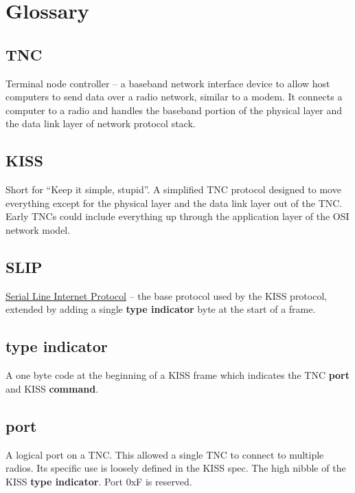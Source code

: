 \documentclass[a4paper,11pt]{book}
\begin{document}
\section{Glossary}

\subsection{TNC}

Terminal node controller -- a baseband network interface device to allow host computers to send data over a radio network, similar to a modem. It connects a computer to a radio and handles the baseband portion of the physical layer and the data link layer of network protocol stack.

\subsection{KISS}

Short for ``Keep it simple, stupid''. A simplified TNC protocol designed to move everything except for the physical layer and the data link layer out of the TNC. Early TNCs could include everything up through the application layer of the OSI network model.

\subsection{SLIP}

\href{https://en.wikipedia.org/wiki/Serial_Line_Internet_Protocol}{Serial Line Internet Protocol} -- the base protocol used by the KISS protocol, extended by adding a single \textbf{type indicator} byte at the start of a frame.

\subsection{type indicator}

A one byte code at the beginning of a KISS frame which indicates the TNC \textbf{port} and KISS \textbf{command}. 

\subsection{port}

A logical port on a TNC. This allowed a single TNC to connect to multiple radios. Its specific use is loosely defined in the KISS spec. The high nibble of the KISS \textbf{type indicator}. Port 0xF is reserved.
\end{document}
